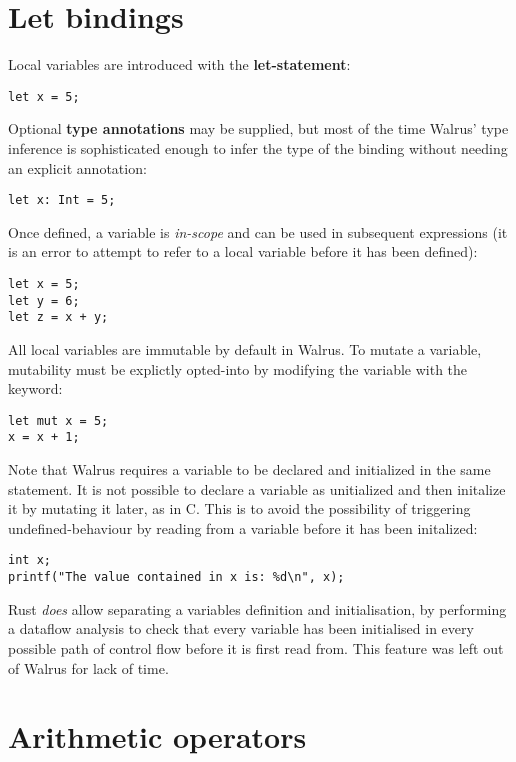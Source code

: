 \section{Let bindings}\label{section:reference:let_bindings}
Local variables are introduced with the \textbf{let-statement}:

\begin{verbatim}
let x = 5;
\end{verbatim}

Optional \textbf{type annotations} may be supplied, but most of the time
Walrus' type inference is sophisticated enough to infer the type of the binding
without needing an explicit annotation:
\begin{verbatim}
let x: Int = 5;
\end{verbatim}

Once defined, a variable is \textit{in-scope} and can be used in subsequent expressions
(it is an error to attempt to refer to a local variable before it has been defined):
\begin{verbatim}
let x = 5;
let y = 6;
let z = x + y;
\end{verbatim}

All local variables are immutable by default in Walrus. To mutate a variable, mutability
must be explictly opted-into by modifying the variable with the  keyword:
\begin{verbatim}
let mut x = 5;
x = x + 1;
\end{verbatim}


Note that Walrus requires a variable to be declared and initialized in the same statement.
It is not possible to declare a variable as unitialized and then initalize it by mutating
it later, as in C. This is to avoid the possibility of triggering undefined-behaviour by
reading from a variable before it has been initalized:
\begin{verbatim}
int x;
printf("The value contained in x is: %d\n", x);
\end{verbatim}

Rust \textit{does} allow separating a variables definition and initialisation, by performing
a dataflow analysis to check that every variable has been initialised in every possible
path of control flow before it is first read from. This feature was left out of Walrus
for lack of time.


\section{Arithmetic operators}\label{section:reference:operators}
